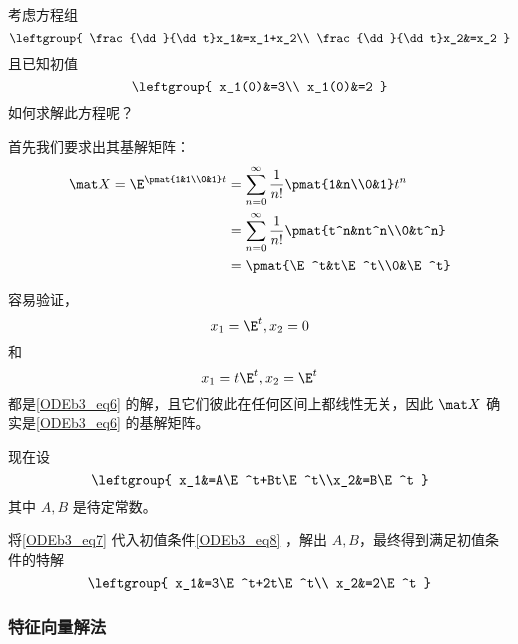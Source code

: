 \begin{example}{}
考虑方程组
\begin{equation}\label{ODEb3_eq6}
\leftgroup{
    \frac{\dd}{\dd t}x_1&=x_1+x_2\\
    \frac{\dd}{\dd t}x_2&=x_2
}
\end{equation}
且已知初值
\begin{equation}\label{ODEb3_eq8}
\leftgroup{
    x_1(0)&=3\\
    x_1(0)&=2
}
\end{equation}
如何求解此方程呢？

首先我们要求出其基解矩阵：
\begin{equation}
\begin{aligned}
\mat X=\E^{\pmat{1&1\\0&1}t}&=\sum_{n=0}^\infty\frac{1}{n!}\pmat{1&n\\0&1}t^n\\
&=\sum_{n=0}^\infty\frac{1}{n!}\pmat{t^n&nt^n\\0&t^n}\\
&=\pmat{\E^t&t\E^t\\0&\E^t}
\end{aligned}
\end{equation}

容易验证，
\begin{equation}
x_1=\E^t, x_2=0
\end{equation}
和
\begin{equation}
x_1=t\E^t, x_2=\E^t
\end{equation}
都是\autoref{ODEb3_eq6} 的解，且它们彼此在任何区间上都线性无关，因此 $\mat X$ 确实是\autoref{ODEb3_eq6} 的基解矩阵。

现在设
\begin{equation}\label{ODEb3_eq7}
\leftgroup{
x_1&=A\E^t+Bt\E^t\\x_2&=B\E^t
}
\end{equation}
其中 $A, B$ 是待定常数。

将\autoref{ODEb3_eq7} 代入初值条件\autoref{ODEb3_eq8} ，解出 $A, B$，最终得到满足初值条件的特解
\begin{equation}
\leftgroup{
    x_1&=3\E^t+2t\E^t\\
    x_2&=2\E^t
}
\end{equation}


\end{example}

\subsubsection{特征向量解法}

